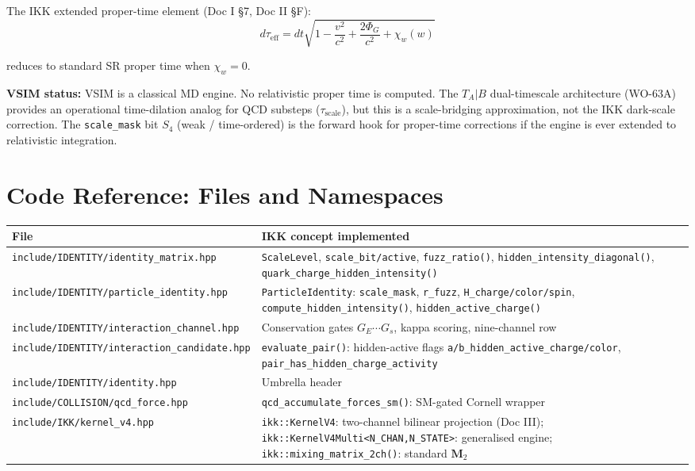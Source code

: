 \documentclass[11pt, a4paper, oneside]{article}
\theoremstyle{definition}
\theoremstyle{remark}
\begin{document}
The IKK extended proper-time element (Doc I \S7, Doc II \S F):
\begin{equation}
  d\tau_\text{eff}
  = dt\sqrt{1 - \frac{v^2}{c^2} + \frac{2\Phi_G}{c^2} + \chi_w(w)}
\end{equation}

reduces to standard SR proper time when $\chi_w = 0$.

\textbf{VSIM status:} VSIM is a classical MD engine.  No relativistic proper
time is computed.  The $T_A|B$ dual-timescale architecture (WO-63A) provides
an operational time-dilation analog for QCD substeps ($\tau_\text{scale}$),
but this is a scale-bridging approximation, not the IKK dark-scale correction.
The \texttt{scale\_mask} bit $S_4$ (weak / time-ordered) is the forward
hook for proper-time corrections if the engine is ever extended to
relativistic integration.

\section{Code Reference: Files and Namespaces}

\begin{center}
  \begin{tabularx}{\linewidth}{l X}
	\toprule
	File & IKK concept implemented \\
	\midrule
	\texttt{include/IDENTITY/identity\_matrix.hpp}
	  & \texttt{ScaleLevel}, \texttt{scale\_bit/active}, \texttt{fuzz\_ratio()},
		\texttt{hidden\_intensity\_diagonal()}, \texttt{quark\_charge\_hidden\_intensity()} \\
	\texttt{include/IDENTITY/particle\_identity.hpp}
	  & \texttt{ParticleIdentity}: \texttt{scale\_mask}, \texttt{r\_fuzz},
		\texttt{H\_charge/color/spin}, \texttt{compute\_hidden\_intensity()},
		\texttt{hidden\_active\_charge()} \\
	\texttt{include/IDENTITY/interaction\_channel.hpp}
	  & Conservation gates $G_E \cdots G_s$, kappa scoring,
		nine-channel row \\
	\texttt{include/IDENTITY/interaction\_candidate.hpp}
	  & \texttt{evaluate\_pair()}: hidden-active flags
		\texttt{a/b\_hidden\_active\_charge/color},
		\texttt{pair\_has\_hidden\_charge\_activity} \\
	\texttt{include/IDENTITY/identity.hpp}
	  & Umbrella header \\
	\texttt{include/COLLISION/qcd\_force.hpp}
	  & \texttt{qcd\_accumulate\_forces\_sm()}: SM-gated Cornell wrapper \\
	\texttt{include/IKK/kernel\_v4.hpp}
	  & \texttt{ikk::KernelV4}: two-channel bilinear projection (Doc III);
		\texttt{ikk::KernelV4Multi<N\_CHAN,N\_STATE>}: generalised engine;
		\texttt{ikk::mixing\_matrix\_2ch()}: standard $\mathbf{M}_2$ \\
	\bottomrule
  \end{tabularx}
\end{center}
\end{document}
